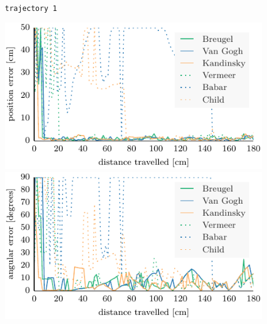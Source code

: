 \documentclass[letterpaper, 10pt, conference]{ieeeconf}
\begin{document}
\begin{figure}
\begin{center}
\texttt{trajectory~1}
\end{center}
\includegraphics{ml-grayscale_images-random_1-xy}\hfill
\includegraphics{ml-grayscale_images-random_1-theta}



\end{figure}
\end{document}
